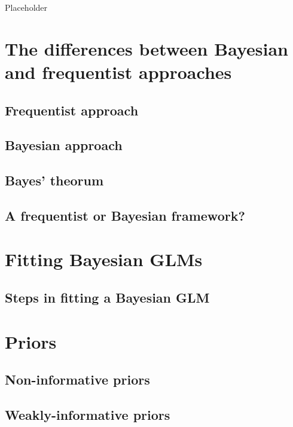 \documentclass[
]{book}
\begin{document}
Placeholder

\hypertarget{freqbayes}{%
\section{The differences between Bayesian and frequentist
approaches}\label{freqbayes}}

\hypertarget{freq}{%
\subsection{Frequentist approach}\label{freq}}

\hypertarget{bayesian}{%
\subsection{Bayesian approach}\label{bayesian}}

\hypertarget{theorum}{%
\subsection{Bayes' theorum}\label{theorum}}

\hypertarget{which}{%
\subsection{A frequentist or Bayesian framework?}\label{which}}

\hypertarget{fit-glms}{%
\section{Fitting Bayesian GLMs}\label{fit-glms}}

\hypertarget{fit-steps}{%
\subsection{Steps in fitting a Bayesian GLM}\label{fit-steps}}

\hypertarget{intro-priors}{%
\section{Priors}\label{intro-priors}}

\hypertarget{flat-priors}{%
\subsection{Non-informative priors}\label{flat-priors}}

\hypertarget{weak-priors}{%
\subsection{Weakly-informative priors}\label{weak-priors}}
\end{document}

